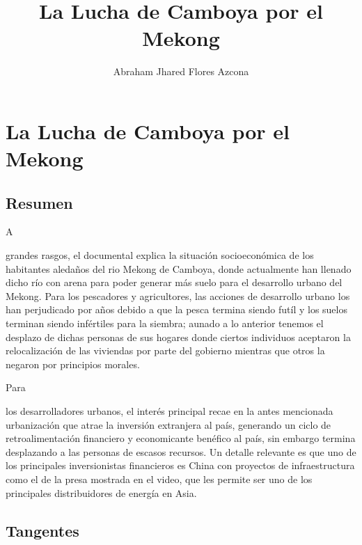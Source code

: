 \documentclass[stu, 12pt, letterpaper, donotrepeattitle, floatsintext, natbib]{apa7}
\title{\Large La Lucha de Camboya por el Mekong}
\author{Abraham Jhared Flores Azcona} %
\affiliation{Instituto Tecnológico de Tijuana}
\begin{document}
\maketitle


\renewcommand\contentsname{Contenido}
\tableofcontents

\newpage
\section{La Lucha de Camboya por el Mekong}
\subsection{Resumen}
A \begin{justifying}
  grandes rasgos, el documental \citep{dw-documentary-2021} explica la situación socioeconómica de los habitantes aledaños
del rio Mekong de Camboya, donde actualmente han llenado dicho río con arena para poder generar 
más suelo para el desarrollo urbano del Mekong. Para los pescadores y agricultores, las acciones de desarrollo
urbano los han perjudicado por años debido a que la pesca termina siendo futíl y los
suelos terminan siendo infértiles para la siembra; aunado a lo anterior tenemos el desplazo de dichas
personas de sus hogares donde ciertos individuos aceptaron la relocalización de las viviendas por parte del gobierno mientras que otros
la negaron por principios morales.\par
\end{justifying}
Para \begin{justifying}
  los desarrolladores urbanos, el interés principal recae en la antes mencionada urbanización que atrae
la inversión extranjera al país, generando un ciclo de retroalimentación financiero y economicante benéfico al país, sin embargo
termina desplazando a las personas de escasos recursos. Un detalle relevante es que uno de los principales inversionistas financieros
es China con proyectos de infraestructura como el de la presa mostrada en el video, que les permite ser uno de los principales distribuidores
de energía en Asia.\par
\end{justifying}
\vspace{\baselineskip}
\subsection{Tangentes}
\end{document}
